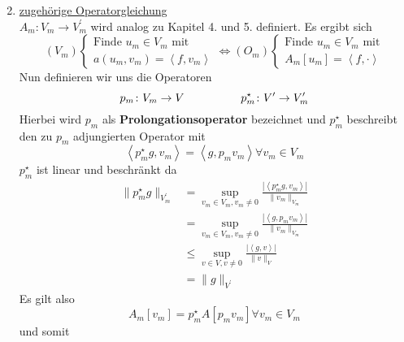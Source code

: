 \begin{enumerate}
	\setcounter{enumi}{1}
	\item \underline{zugehörige Operatorgleichung}\\
		$A_{m}\colon V_{m}\to V_{m}^{\prime}$ wird analog zu Kapitel 4. und 5. definiert. Es ergibt sich
		\begin{equation*}
			\left(V_{m}\right)\begin{cases}
				\text{Finde }u_{m}\in V_{m}\text{ mit}\\
				a\left(u_{m},v_{m}\right) = \left<f,v_{m}\right>
			\end{cases}
			\Leftrightarrow \left(O_{m}\right)\begin{cases}
				\text{Finde }u_{m}\in V_{m}\text{ mit}\\
				A_{m}\left[u_{m}\right] = \left<f,\cdot\right>
			\end{cases}
		\end{equation*}
		Nun definieren wir uns die Operatoren
		\begin{equation*}
			p_{m}\colon V_{m}\to V \hspace*{5em} p_{m}^{\star}\colon V^{\prime} \to V_{m}^{\prime}
		\end{equation*}
		Hierbei wird $p_{m}$ als \textbf{Prolongationsoperator} bezeichnet und $p_{m}^{\star}$ beschreibt den zu $p_{m}$ adjungierten Operator mit
		\begin{equation*}
			\left<p_{m}^{\star}g,v_{m}\right> = \left<g,p_{m}v_{m}\right> \forall v_{m}\in V_{m}
		\end{equation*}
		$p_{m}^{\star}$ ist linear und beschränkt da
		\begin{align*}
			\|p_{m}^{\star}g\|_{V_{m}^{\prime}} &= \operatorname{sup}_{v_{m}\in V_{m}, v_{m}\neq 0} \frac{|\left<p_{m}^{\star}g,v_{m}\right>|}{\|v_{m}\|_{V_{m}}}\\
			&= \operatorname{sup}_{v_{m}\in V_{m}, v_{m}\neq 0} \frac{|\left<g,p_{m}v_{m}\right>|}{\|v_{m}\|_{V_{m}}}\\
			&\leq \operatorname{sup}_{v\in V, v\neq 0} \frac{|\left<g,v\right>|}{\|v\|_{V}}\\
			&= \|g\|_{V^{\prime}}
		\end{align*}
		Es gilt also
		\begin{equation*}
			A_{m}\left[v_{m}\right] = p_{m}^{\star}A\left[p_{m}v_{m}\right] \forall v_{m}\in V_{m}
		\end{equation*}
		und somit
		\begin{align*}

\end{align*}
\end{enumerate}
